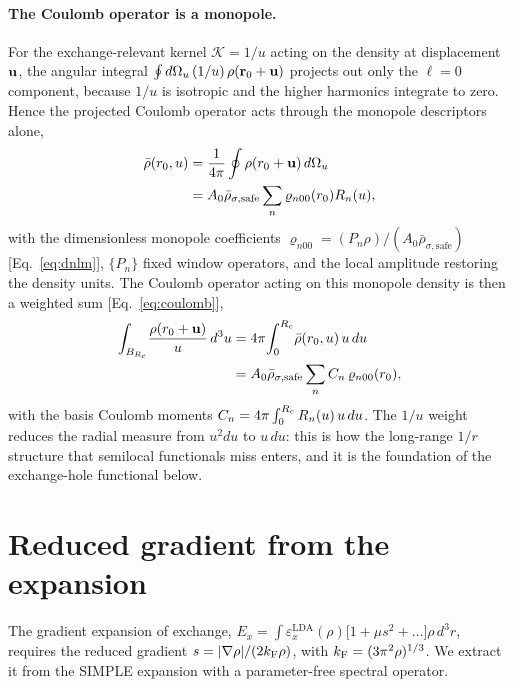 \paragraph*{The Coulomb operator is a monopole.}
For the exchange-relevant kernel $\mathcal K=1/u$ acting on the density at
displacement $\mathbf{u}$, the angular integral $\oint d\Omega_u\,(1/u)\,
\rho(\mathbf{r}_0+\mathbf{u})$ projects out only the $\ell=0$ component, because $1/u$ is
isotropic and the higher harmonics integrate to zero. Hence the projected Coulomb
operator acts through the monopole descriptors alone,
\begin{equation}
\begin{aligned}
\bar\rho(r_0,u)&=\frac{1}{4\pi}\oint\rho(r_0+\mathbf{u})\,d\Omega_u\\
&=A_0\bar\rho_{\sigma,\mathrm{safe}}\sum_n \varrho_{n00}(r_0)R_n(u) ,
\end{aligned}
\end{equation}
with the dimensionless monopole coefficients
$\varrho_{n00}=(P_n\rho)/(A_0\bar\rho_{\sigma,\mathrm{safe}})$ [Eq.~\eqref{eq:dnlm}], $\{P_n\}$ fixed
window operators, and the local amplitude restoring the density units. The Coulomb operator acting on
this monopole density is then a weighted sum [Eq.~\eqref{eq:coulomb}],
\begin{equation}
\begin{aligned}
\int_{B_{R_{c}}}\!\frac{\rho(r_0+\mathbf{u})}{u}\,d^3u
&=4\pi\!\int_0^{R_{c}}\!\bar\rho(r_0,u)\,u\,du\\
&=A_0\bar\rho_{\sigma,\mathrm{safe}}\sum_n C_n\,\varrho_{n00}(r_0),
\end{aligned}
\end{equation}
with the basis Coulomb moments $C_n=4\pi\int_0^{R_{c}}R_n(u)\,u\,du$. The $1/u$ weight reduces the radial
measure from $u^2du$ to $u\,du$: this is how the long-range $1/r$ structure that
semilocal functionals miss enters, and it is the foundation of the exchange-hole
functional below.

\section{Reduced gradient from the expansion}
\label{app:gea}

The gradient expansion of exchange,
$E_x=\int\varepsilon_x^{\mathrm{LDA}}(\rho)\bigl[1+\mu s^2+\dots\bigr]\rho\,d^3r$,
requires the reduced gradient $s=|\nabla\rho|/(2k_{\mathrm{F}}\rho)$, with
$k_{\mathrm{F}}=(3\pi^2\rho)^{1/3}$. We extract it from the SIMPLE expansion with a
parameter-free spectral operator.

